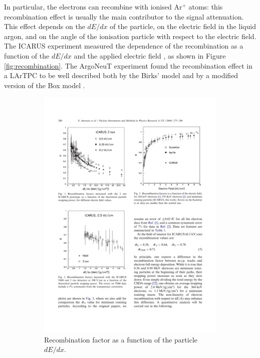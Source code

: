 In particular, the electrons can recombine with ionised Ar$^+$ atoms: this recombination effect is usually the main contributor to the signal attenuation. This effect depends on the $dE/dx$ of the particle, on the electric field in the liquid argon, and on the angle of the ionisation particle with respect to the electric field. The ICARUS experiment measured the dependence of the recombination as a function of the $dE/dx$ and the applied electric field \cite{Amoruso:2004dy}, as shown in Figure \ref{fig:recombination}. The ArgoNeuT experiment found the recombination effect in a LArTPC to be well described both by the Birks' model \cite{Birks:1951boa} and by a modified version of the Box model \cite{Thomas:1987zz}. 

\begin{figure}[htbp]
\centering
  \begin{subfigure}{0.48\textwidth}
    \includegraphics[height=0.9\linewidth]{figures/icarus1.pdf}
    \caption{Recombination factor as a function of the particle $dE/dx$.}
  \end{subfigure}\hfill
  \begin{subfigure}{0.48\textwidth}
    \begin{center}

\end{center}
\end{subfigure}
\end{figure}
